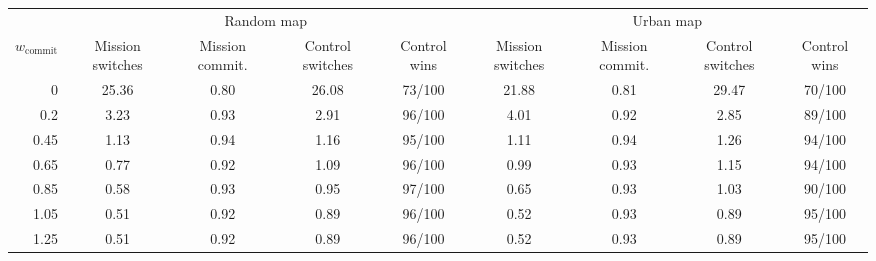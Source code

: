 \begin{tabular}{r|cccc|cccc}
\toprule
 & \multicolumn{4}{c|}{Random map} & \multicolumn{4}{c}{Urban map} \\
$w_{\mathrm{commit}}$ & Mission switches & Mission commit. & Control switches & Control wins & Mission switches & Mission commit. & Control switches & Control wins \\
\midrule
0 & 25.36 & 0.80 & 26.08 & 73/100 & 21.88 & 0.81 & 29.47 & 70/100 \\
0.2 & 3.23 & 0.93 & 2.91 & 96/100 & 4.01 & 0.92 & 2.85 & 89/100 \\
0.45 & 1.13 & 0.94 & 1.16 & 95/100 & 1.11 & 0.94 & 1.26 & 94/100 \\
0.65 & 0.77 & 0.92 & 1.09 & 96/100 & 0.99 & 0.93 & 1.15 & 94/100 \\
0.85 & 0.58 & 0.93 & 0.95 & 97/100 & 0.65 & 0.93 & 1.03 & 90/100 \\
1.05 & 0.51 & 0.92 & 0.89 & 96/100 & 0.52 & 0.93 & 0.89 & 95/100 \\
1.25 & 0.51 & 0.92 & 0.89 & 96/100 & 0.52 & 0.93 & 0.89 & 95/100 \\
\bottomrule
\end{tabular}
